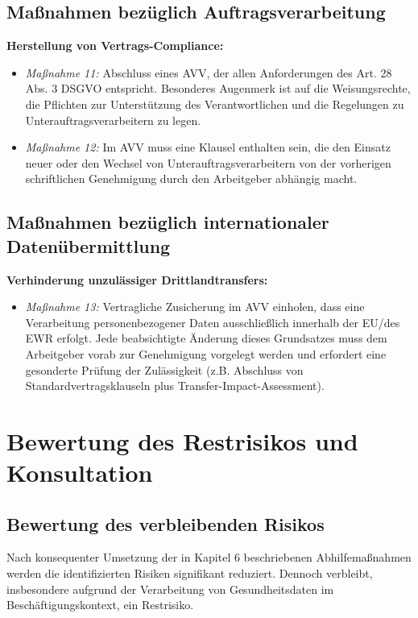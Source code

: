 \documentclass[12pt, a4paper]{article}
\begin{document}
\subsection{Maßnahmen bezüglich Auftragsverarbeitung}
\textbf{Herstellung von Vertrags-Compliance:}
\begin{itemize}
    \item \textit{Maßnahme 11:} Abschluss eines AVV, der allen Anforderungen des Art. 28 Abs. 3 DSGVO entspricht. Besonderes Augenmerk ist auf die Weisungsrechte, die Pflichten zur Unterstützung des Verantwortlichen und die Regelungen zu Unterauftragsverarbeitern zu legen.
    \item \textit{Maßnahme 12:} Im AVV muss eine Klausel enthalten sein, die den Einsatz neuer oder den Wechsel von Unterauftragsverarbeitern von der vorherigen schriftlichen Genehmigung durch den Arbeitgeber abhängig macht.
\end{itemize}

\subsection{Maßnahmen bezüglich internationaler Datenübermittlung}
\textbf{Verhinderung unzulässiger Drittlandtransfers:}
\begin{itemize}
    \item \textit{Maßnahme 13:} Vertragliche Zusicherung im AVV einholen, dass eine Verarbeitung personenbezogener Daten ausschließlich innerhalb der EU/des EWR erfolgt. Jede beabsichtigte Änderung dieses Grundsatzes muss dem Arbeitgeber vorab zur Genehmigung vorgelegt werden und erfordert eine gesonderte Prüfung der Zulässigkeit (z.B. Abschluss von Standardvertragsklauseln plus Transfer-Impact-Assessment).
\end{itemize}

\section{Bewertung des Restrisikos und Konsultation}

\subsection{Bewertung des verbleibenden Risikos}
Nach konsequenter Umsetzung der in Kapitel 6 beschriebenen Abhilfemaßnahmen werden die identifizierten Risiken signifikant reduziert. Dennoch verbleibt, insbesondere aufgrund der Verarbeitung von Gesundheitsdaten im Beschäftigungskontext, ein Restrisiko.
\end{document}
